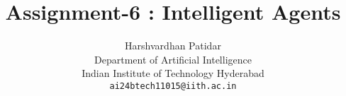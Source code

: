 \documentclass{article}
\title{Assignment-6 : Intelligent Agents}
\author{Harshvardhan Patidar\\
  Department of Artificial Intelligence\\
  Indian Institute of Technology Hyderabad\\
  \texttt{ai24btech11015@iith.ac.in}
}
\begin{document}
\



\maketitle






















\end{document}
